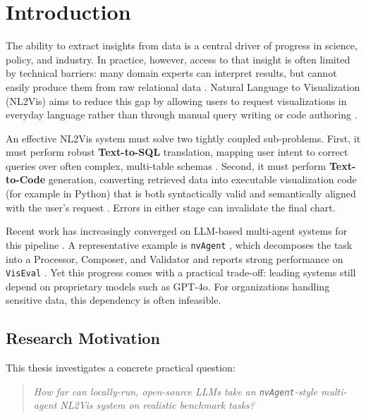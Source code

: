 \documentclass[a4paper,oneside,bibliography=totoc]{scrbook}
\begin{document}

\mainmatter

\chapter{Introduction}
\label{ch:intro}

The ability to extract insights from data is a central driver of progress in science, policy, and industry. In practice, however, access to that insight is often limited by technical barriers: many domain experts can interpret results, but cannot easily produce them from raw relational data \cite{wu2024automated}. Natural Language to Visualization (NL2Vis) aims to reduce this gap by allowing users to request visualizations in everyday language rather than through manual query writing or code authoring \cite{maddigan2023chat2vis}.

An effective NL2Vis system must solve two tightly coupled sub-problems. First, it must perform robust \textbf{Text-to-SQL} translation, mapping user intent to correct queries over often complex, multi-table schemas \cite{zhu2024survey,wu2024automated}. Second, it must perform \textbf{Text-to-Code} generation, converting retrieved data into executable visualization code (for example in Python) that is both syntactically valid and semantically aligned with the user's request \cite{huynh2025survey}. Errors in either stage can invalidate the final chart.

Recent work has increasingly converged on LLM-based multi-agent systems for this pipeline \cite{li2024mas}. A representative example is \texttt{nvAgent} \cite{ouyang2025nvagent}, which decomposes the task into a Processor, Composer, and Validator and reports strong performance on \texttt{VisEval} \cite{chen2025viseval}. Yet this progress comes with a practical trade-off: leading systems still depend on proprietary models such as GPT-4o. For organizations handling sensitive data, this dependency is often infeasible.

\section{Research Motivation}

This thesis investigates a concrete practical question:
\begin{quote}
\emph{How far can locally-run, open-source LLMs take an \texttt{nvAgent}-style multi-agent NL2Vis system on realistic benchmark tasks?}
\end{quote}
\end{document}
